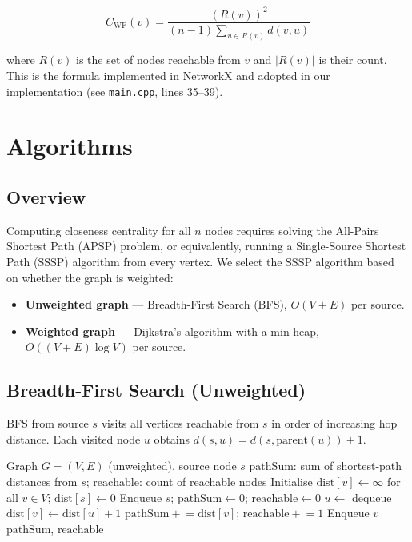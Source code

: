 \documentclass[12pt,a4paper]{article}
\begin{document}
\begin{equation}
  C_{\mathrm{WF}}(v) = \frac{(R(v))^2}{(n-1)\displaystyle\sum_{u \in R(v)} d(v,u)}
  \label{eq:wf}
\end{equation}

where $R(v)$ is the set of nodes reachable from $v$ and $|R(v)|$ is their count.
This is the formula implemented in NetworkX and adopted in our implementation (see
\texttt{main.cpp}, lines 35--39).

\section{Algorithms}
\label{sec:algorithms}

\subsection{Overview}
Computing closeness centrality for all $n$ nodes requires solving the All-Pairs
Shortest Path (APSP) problem, or equivalently, running a Single-Source Shortest Path
(SSSP) algorithm from every vertex.  We select the SSSP algorithm based on whether the
graph is weighted:

\begin{itemize}
  \item \textbf{Unweighted graph} — Breadth-First Search (BFS), $O(V + E)$ per source.
  \item \textbf{Weighted graph} — Dijkstra's algorithm with a min-heap,
        $O((V + E)\log V)$ per source.
\end{itemize}

\subsection{Breadth-First Search (Unweighted)}
BFS from source $s$ visits all vertices reachable from $s$ in order of increasing hop
distance.  Each visited node $u$ obtains $d(s,u) = d(s,\mathrm{parent}(u)) + 1$.

\begin{algorithm}[H]
\caption{BFS-based Closeness Centrality (single source)}
\label{alg:bfs}
\begin{algorithmic}[1]
\Require Graph $G=(V,E)$ (unweighted), source node $s$
\Ensure $\mathrm{pathSum}$: sum of shortest-path distances from $s$; $\mathrm{reachable}$: count of reachable nodes
\State Initialise $\mathrm{dist}[v] \gets \infty$ for all $v \in V$; $\mathrm{dist}[s] \gets 0$
\State Enqueue $s$; $\mathrm{pathSum} \gets 0$; $\mathrm{reachable} \gets 0$
  \State $u \gets$ dequeue
      \State $\mathrm{dist}[v] \gets \mathrm{dist}[u] + 1$
      \State $\mathrm{pathSum} \mathrel{+}= \mathrm{dist}[v]$; $\mathrm{reachable} \mathrel{+}= 1$
      \State Enqueue $v$
    \EndIf
  \EndFor
\EndWhile
\State \Return $\mathrm{pathSum}$, $\mathrm{reachable}$
\end{algorithmic}
\end{algorithm}
\end{document}
